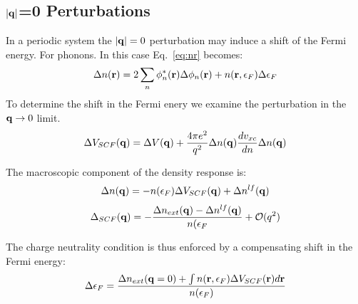 \documentclass{article}
\def\r{{\bf r}}
\def\q{{\bf q}}
\begin{document}
\subsection{$|\q|$=0 Perturbations}
In a periodic system the $|\q|=0$ perturbation may induce a shift of the Fermi
energy. For phonons. In this case Eq.~\ref{eq:nr} becomes:
%
\begin{equation}
\Delta n(\r) = 2 \sum_{n} \phi_{n}^{*}(\r)\Delta\phi_{n}(\r) + n(\r,\epsilon_{F})\Delta\epsilon_{F}
\end{equation}
%
To determine the shift in the Fermi enery we examine the perturbation in the $\q \rightarrow 0$ limit.
%
\begin{equation}
\Delta V_{SCF}(\q) = \Delta V(\q) + \frac{4\pi e^{2}}{q^{2}}\Delta n(\q) \frac{dv_{xc}}{dn}\Delta n(\q)
\end{equation}

The macroscopic component of the density response is:
%
\begin{equation}
\Delta n(\q) = -n(\epsilon_{F}) \Delta V_{SCF}(\q) + \Delta n^{lf}(\q)
\end{equation}
%
\begin{equation}
\Delta_{SCF}(\q) = -\frac{\Delta n_{ext}(\q) -\Delta n^{lf}(\q)}{n(\epsilon_{F}} + \mathcal{O}(q^{2})
\end{equation}

The charge neutrality condition is thus enforced
by a compensating shift in the Fermi energy:
%
\begin{equation}
\Delta \epsilon_{F}=\frac{\Delta n_{ext}(\q=0)+\int n(\r,\epsilon_{F})\Delta V_{SCF}(\r)d\r}{n(\epsilon_{F})}
\end{equation}
\end{document}
